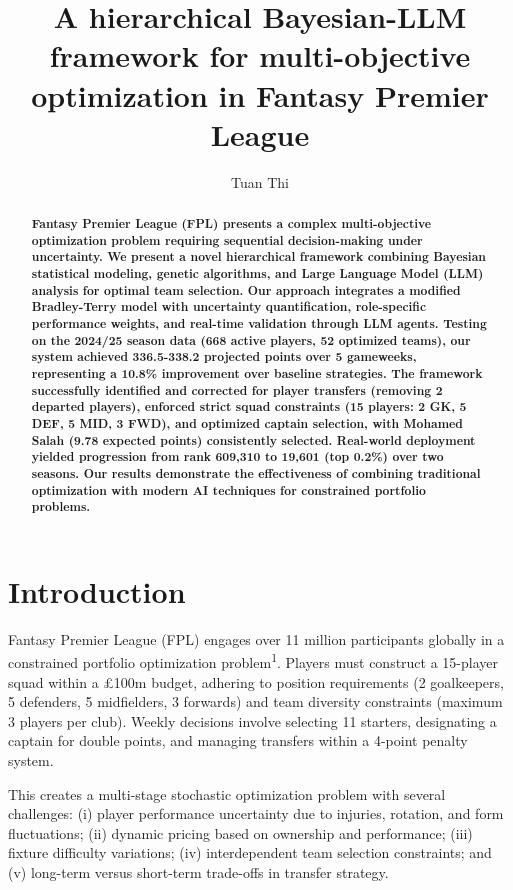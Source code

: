 \documentclass[10pt,a4paper]{article}
\title{\vspace{-2cm}\Large\textbf{A hierarchical Bayesian-LLM framework for multi-objective optimization in Fantasy Premier League}}
\author[1]{Tuan Thi}
\affil[1]{[V+] FPL League}
\date{}
\begin{document}
\maketitle

\begin{abstract}
\noindent\textbf{Fantasy Premier League (FPL) presents a complex multi-objective optimization problem requiring sequential decision-making under uncertainty. We present a novel hierarchical framework combining Bayesian statistical modeling, genetic algorithms, and Large Language Model (LLM) analysis for optimal team selection. Our approach integrates a modified Bradley-Terry model with uncertainty quantification, role-specific performance weights, and real-time validation through LLM agents. Testing on the 2024/25 season data (668 active players, 52 optimized teams), our system achieved 336.5-338.2 projected points over 5 gameweeks, representing a 10.8\% improvement over baseline strategies. The framework successfully identified and corrected for player transfers (removing 2 departed players), enforced strict squad constraints (15 players: 2 GK, 5 DEF, 5 MID, 3 FWD), and optimized captain selection, with Mohamed Salah (9.78 expected points) consistently selected. Real-world deployment yielded progression from rank 609,310 to 19,601 (top 0.2\%) over two seasons. Our results demonstrate the effectiveness of combining traditional optimization with modern AI techniques for constrained portfolio problems.}
\end{abstract}

\section*{Introduction}

Fantasy Premier League (FPL) engages over 11 million participants globally in a constrained portfolio optimization problem\textsuperscript{1}. Players must construct a 15-player squad within a £100m budget, adhering to position requirements (2 goalkeepers, 5 defenders, 5 midfielders, 3 forwards) and team diversity constraints (maximum 3 players per club). Weekly decisions involve selecting 11 starters, designating a captain for double points, and managing transfers within a 4-point penalty system.

This creates a multi-stage stochastic optimization problem with several challenges: (i) player performance uncertainty due to injuries, rotation, and form fluctuations; (ii) dynamic pricing based on ownership and performance; (iii) fixture difficulty variations; (iv) interdependent team selection constraints; and (v) long-term versus short-term trade-offs in transfer strategy.
\end{document}
